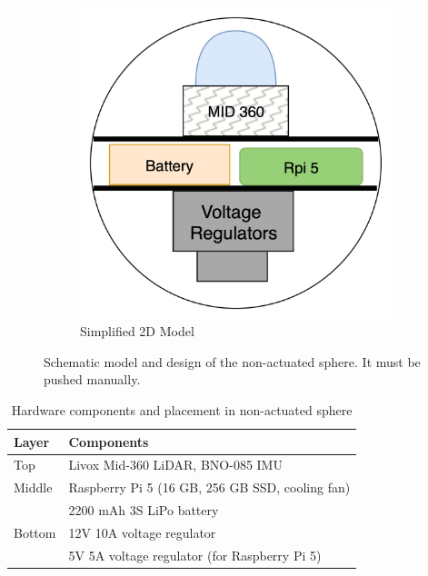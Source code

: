\documentclass[english, bachelor, utf8]{base/thesis_telematics}
\begin{document}
\begin{figure}
\begin{subfigure}{0.4\columnwidth}
    \includegraphics[width=\textwidth]{pics/image.png}
    \caption{Simplified 2D Model}
    \label{fig:2d-model}
\end{subfigure}
\caption{Schematic model and design of the non-actuated sphere.
It must be pushed manually.}
\label{fig:cad-design1}
\end{figure}
\begin{table}
\centering
\caption{Hardware components and placement in non-actuated sphere}
\label{tab:hardware_components_non_actuated}
\begin{tabularx}{\linewidth}{@{}l X@{}}
\toprule
\textbf{Layer} & \textbf{Components} \\
\midrule
Top    & Livox Mid-360 LiDAR, BNO-085 IMU \\
Middle & Raspberry Pi 5 (16 GB, 256 GB SSD, cooling fan) \\
       & 2200 mAh 3S LiPo battery \\
Bottom & 12V 10A voltage regulator \\
       & 5V 5A voltage regulator (for Raspberry Pi 5) \\

\bottomrule
\end{tabularx}
\vspace{-1em}
\end{table}
\end{document}
